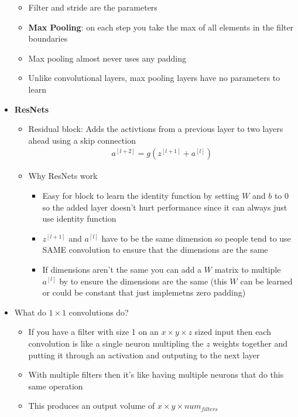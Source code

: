 \documentclass[12pt]{article}
\begin{document}
\begin{itemize}
\begin{itemize}
        \item Filter and stride are the parameters
        \item \textbf{Max Pooling}: on each step you take the max of all elements in the filter boundaries
        \item Max pooling almost never uses any padding
        \item Unlike convolutional layers, max pooling layers have no parameters to learn
    \end{itemize}
    \item \textbf{ResNets}
    \begin{itemize}
        \item Residual block: Adds the activtions from a previous layer to two layers ahead
        using a skip connection
        \begin{gather*}
            a^{[l+2]} = g(z^{[l+1]} + a^{[l]})
        \end{gather*}
        \item Why ResNets work
        \begin{itemize}
            \item Easy for block to learn the identity function by setting $W$ and $b$ to 0
            so the added layer doesn't hurt performance since it can always just use identity function
            \item $z^{[l+1]}$ and $a^{[l]}$ have to be the same dimension so people tend to use SAME convolution
            to ensure that the dimensions are the same
            \item If dimensions aren't the same you can add a $W$ matrix to multiple $a^{[l]}$ by to ensure
            the dimensions are the same (this $W$ can be learned or could be constant that just implemetns zero padding)
        \end{itemize}
    \end{itemize}
    \item What do $1\times1$ convolutions do?
    \begin{itemize}
        \item If you have a filter with size 1 on an $x \times y \times z$ sized
        input then each convolution is like a single neuron multipling the $z$ weights together
        and putting it through an activation and outputing to the next layer
        \item With multiple filters then it's like having multiple neurons that do
        this same operation
        \item This produces an output volume of $x \times y \times num_{filters}$

\end{itemize}
\end{itemize}
\end{document}
